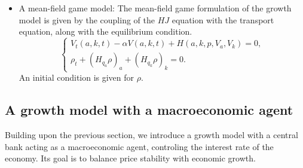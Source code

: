 \documentclass{article}
\begin{document}
\begin{itemize}
    \item A mean-field game model: The mean-field game formulation of the growth model is given by
    the coupling of the $HJ$ equation with the transport equation, along with the equilibrium condition.
    $$
    \begin{cases}
        V_t(a,k,t) - \alpha V(a,k,t) + H(a,k,p,V_a,V_k) = 0,\\
        \rho_t + (H_{q_a} \rho)_a + (H_{q_k} \rho)_k = 0.
    \end{cases}
    $$
    An initial condition is given for $\rho$.
\end{itemize}

\subsection{A growth model with a macroeconomic agent}

Building upon the previous section, we introduce a growth model with a central bank acting as 
a macroeconomic agent, controling the interest rate of the economy. Its goal is to balance
price stability with economic growth.
\end{document}

